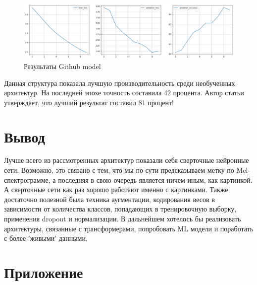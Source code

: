 \documentclass[a4paper,12pt]{article}
\begin{document}
 		\begin{figure}[H]
 		\centering
 		\includegraphics[width=1\linewidth]{Image/Github_model_train.png}
 		\caption{Результаты Github model}
 		\label{fig:githubmodel}
 	\end{figure}
 Данная структура показала лучшую производительность среди необученных архитектур. На последней эпохе точность составила 42 процента. Автор статьи утверждает, что лучший результат составил 81 процент!
 	\newpage
 	
 	\section{Вывод}
 	Лучше всего из рассмотренных архитектур показали себя сверточные нейронные сети. Возможно, это связано с тем, что мы по сути предсказываем метку по Mel-спектрограмме, а последняя в свою очередь является ничем иным, как картинкой. А сверточные сети как раз хорошо работают именно с картинками. Также достаточно полезной была техника  аугментации, кодирования весов в зависимости от количества классов, попадающих в тренировочную выборку, применения dropout и нормализации. В дальнейшем хотелось бы реализовать архитектуры, связанные с трансформерами, попробовать ML модели и поработать с более 'живыми' данными. 
 	\newpage
 	
 	 	\section{Приложение}
 	
\end{document}
